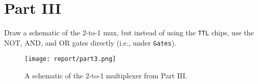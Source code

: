 \documentclass{article}
\begin{document}
\newpage
\section*{Part III}

Draw a schematic of the 2-to-1 mux, but instead of using the \verb|TTL| chips, use the NOT, AND, and OR gates directly (i.e., under \verb|Gates|).

\begin{figure}[h]
  \centering
  \texttt{[image: report/part3.png]}
   \caption{A schematic of the 2-to-1 multiplexer from Part III.}
  \label{fig:part1}
\end{figure}
\end{document}
